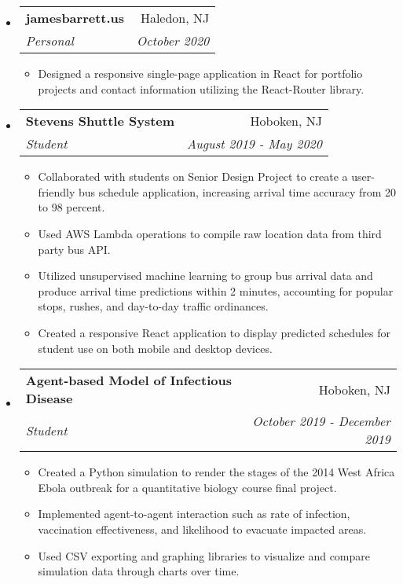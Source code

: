 \documentclass[letterpaper,11pt]{article}
\makeatletter
\newcommand{\ressubheading}[4]{
\begin{tabular*}{7.3in}{l@{\extracolsep{\fill}}r}
		\textbf{#1} & #2 \\
		\textit{#3} & \textit{#4} \\
\end{tabular*}}
\makeatother
\begin{document}
\begin{itemize}[leftmargin=*]
\item
	\ressubheading{jamesbarrett.us}{Haledon, NJ}{Personal}{October 2020}
	\vspace{-0.1in}
	\begin{itemize}[leftmargin=*]
	\setlength\itemsep{0em}
		\item{Designed a responsive single-page application in React for portfolio projects and contact
information utilizing the React-Router library.}
		
	\end{itemize}
	
\item
	\ressubheading{Stevens Shuttle System}{Hoboken, NJ}{Student}{August 2019 - May 2020}
	\vspace{-0.1in}
	\begin{itemize}[leftmargin=*]
	\setlength\itemsep{0em}
		\item{Collaborated with students on Senior Design Project to create a user-friendly bus schedule application, increasing arrival time accuracy from 20 to 98 percent.}
		\item{Used AWS Lambda operations to compile raw location data from third party bus API.}
		\item{Utilized unsupervised machine learning to group bus arrival data and produce arrival time predictions within 2 minutes, accounting for popular stops, rushes, and day-to-day traffic ordinances.}
		\item{Created a responsive React application to display predicted schedules for student use on both mobile and desktop devices.}
	\end{itemize}

\item
	\ressubheading{Agent-based Model of Infectious Disease}{Hoboken, NJ}{Student}{October 2019 - December 2019}
	\vspace{-0.1in}
	\begin{itemize}[leftmargin=*]
	\setlength\itemsep{0em}
		\item{Created a Python simulation to render the stages of the 2014 West Africa Ebola outbreak for a quantitative biology course final project.}
		\item{Implemented agent-to-agent interaction such as rate of infection, vaccination effectiveness, and likelihood to evacuate impacted areas.
}		
		\item{Used CSV exporting and graphing libraries to visualize and compare simulation data through charts over time.}
		
	\end{itemize}
	
\end{itemize}
\end{document}
